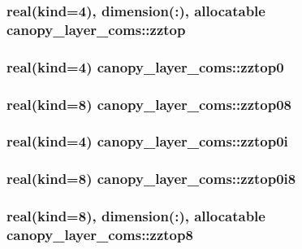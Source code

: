 \subsubsection[{zztop}]{\setlength{\rightskip}{0pt plus 5cm}real(kind=4), dimension(\+:), allocatable canopy\+\_\+layer\+\_\+coms\+::zztop}\label{namespacecanopy__layer__coms_a93344c1b6866094b12e1eb38e47b5f1e}
\hypertarget{namespacecanopy__layer__coms_a4a9b49084021750115ba6985f759d65f}{}
\subsubsection[{zztop0}]{\setlength{\rightskip}{0pt plus 5cm}real(kind=4) canopy\+\_\+layer\+\_\+coms\+::zztop0}\label{namespacecanopy__layer__coms_a4a9b49084021750115ba6985f759d65f}
\hypertarget{namespacecanopy__layer__coms_aea39e98fc9395a5c732a1ff65490f332}{}
\subsubsection[{zztop08}]{\setlength{\rightskip}{0pt plus 5cm}real(kind=8) canopy\+\_\+layer\+\_\+coms\+::zztop08}\label{namespacecanopy__layer__coms_aea39e98fc9395a5c732a1ff65490f332}
\hypertarget{namespacecanopy__layer__coms_ab48b7d2c659df17ea27720c6864961cc}{}
\subsubsection[{zztop0i}]{\setlength{\rightskip}{0pt plus 5cm}real(kind=4) canopy\+\_\+layer\+\_\+coms\+::zztop0i}\label{namespacecanopy__layer__coms_ab48b7d2c659df17ea27720c6864961cc}
\hypertarget{namespacecanopy__layer__coms_a87b13c528970235894f31da4d23f4573}{}
\subsubsection[{zztop0i8}]{\setlength{\rightskip}{0pt plus 5cm}real(kind=8) canopy\+\_\+layer\+\_\+coms\+::zztop0i8}\label{namespacecanopy__layer__coms_a87b13c528970235894f31da4d23f4573}
\hypertarget{namespacecanopy__layer__coms_a365c61dc2bce371b5384ff2bbc4c2a9d}{}
\subsubsection[{zztop8}]{\setlength{\rightskip}{0pt plus 5cm}real(kind=8), dimension(\+:), allocatable canopy\+\_\+layer\+\_\+coms\+::zztop8}\label{namespacecanopy__layer__coms_a365c61dc2bce371b5384ff2bbc4c2a9d}
